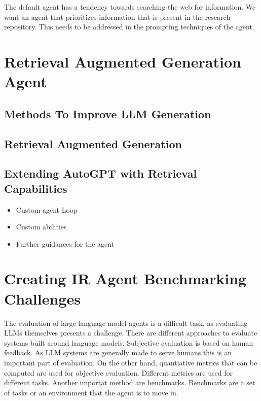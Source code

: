 \documentclass[english, version-2022-01]{uzl-thesis}
\begin{document}
The default agent has a tendency towards searching the web for information. We want an agent that prioritizes information that is present in the research repository. This needs to be addressed in the prompting techniques of the agent.

\chapter{Retrieval Augmented Generation Agent}


\section{Methods To Improve LLM Generation}


\section{Retrieval Augmented Generation}


\section{Extending AutoGPT with Retrieval Capabilities}

\begin{itemize}
	\item Custom agent Loop
	\item Custom abilities
	\item Further guidances for the agent
\end{itemize}

\chapter{Creating IR Agent Benchmarking Challenges}

The evaluation of large language model agents is a difficult task, as evaluating LLMs themselves presents a challenge. There are different approaches to evaluate systems built around language models. Subjective evaluation is based on human feedback. As LLM systems are generally made to serve humans this is an important part of evaluation. On the other hand, quantiative metrics that can be computed are used for objective evaluation. Different metrics are used for different tasks. Another importat method are benchmarks. Benchmarks are a set of tasks or an environment that the agent is to move in.
\end{document}
